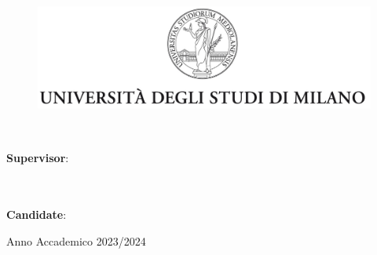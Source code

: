 \begin{titlepage}
\null\vfill
\begin{center}
\large
\sffamily

\begin{figure}
\centering
\includegraphics[width=360pt]{logos/uni.jpg}
\myDepartment
\vspace{0.5 cm}
\end{figure}

\bigskip

{\huge\spacedlowsmallcaps{\myTitle} \\
}

\end{center}

\bigskip
    
\vspace{9cm}


\begin{flushleft}
\textbf{Supervisor}:\\ \myProf \\ \cosupervisor \\ \cocosupervisor
\end{flushleft}
	
\begin{flushright}
\textbf{Candidate}:\\ \myName
\end{flushright}
	
\vfill
\begin{center}
{\large Anno Accademico 2023/2024}
\end{center}

\end{titlepage}